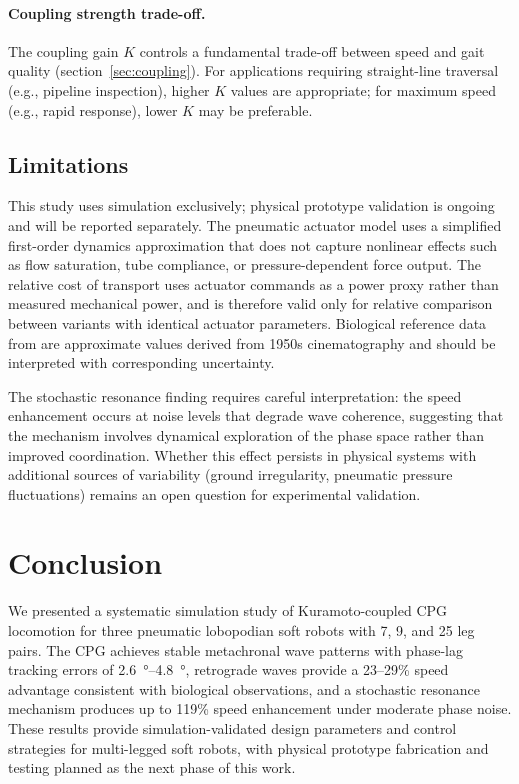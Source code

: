 \documentclass[12pt]{article}
\begin{document}
\paragraph{Coupling strength trade-off.}
The coupling gain $K$ controls a fundamental trade-off between speed
and gait quality (section~\ref{sec:coupling}).
For applications requiring straight-line traversal (e.g., pipeline
inspection), higher $K$ values are appropriate; for maximum speed
(e.g., rapid response), lower $K$ may be preferable.

\subsection{Limitations}

This study uses simulation exclusively; physical prototype validation
is ongoing and will be reported separately.
The pneumatic actuator model uses a simplified first-order dynamics
approximation that does not capture nonlinear effects such as flow
saturation, tube compliance, or pressure-dependent force output.
The relative cost of transport uses actuator commands as a power proxy
rather than measured mechanical power, and is therefore valid only for
relative comparison between variants with identical actuator parameters.
Biological reference data from \citet{manton1950locomotory} are
approximate values derived from 1950s cinematography and should be
interpreted with corresponding uncertainty.

The stochastic resonance finding requires careful interpretation: the
speed enhancement occurs at noise levels that degrade wave coherence,
suggesting that the mechanism involves dynamical exploration of the
phase space rather than improved coordination.
Whether this effect persists in physical systems with additional
sources of variability (ground irregularity, pneumatic pressure
fluctuations) remains an open question for experimental validation.


\section{Conclusion}
\label{sec:conclusion}

We presented a systematic simulation study of Kuramoto-coupled CPG
locomotion for three pneumatic lobopodian soft robots with 7, 9, and
25 leg pairs.
The CPG achieves stable metachronal wave patterns with phase-lag
tracking errors of \SIrange{2.6}{4.8}{\degree}, retrograde waves
provide a 23--29\% speed advantage consistent with biological
observations, and a stochastic resonance mechanism produces up to
119\% speed enhancement under moderate phase noise.
These results provide simulation-validated design parameters and
control strategies for multi-legged soft robots, with physical
prototype fabrication and testing planned as the next phase of this
work.
\end{document}
